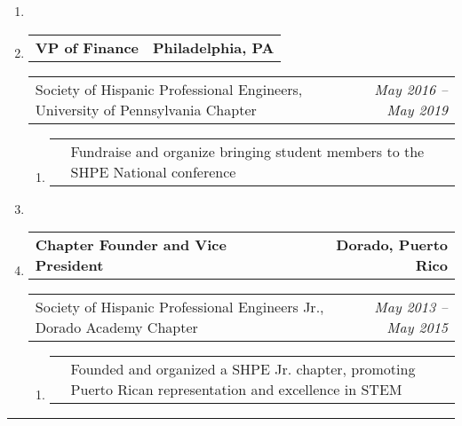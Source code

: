 \documentclass[letterpaper]{article}
\makeatletter
\newcommand*{\tabulardef}[3]{\begin{tabular}[t]{@{}lp{\dimexpr\linewidth-#1}@{}}
    #2&#3
\end{tabular}}
\newcommand{\headerrow}[2]
{\begin{tabular*}{\linewidth}{l@{\extracolsep{\fill}}r}
	#1 &
	#2 \\
\end{tabular*}}
\makeatother
\begin{document}
\begin{enumerate}[label=]
    \item

	\item
		\headerrow
			{\textbf{VP of Finance}}
			{\textbf{Philadelphia, PA}}
	\headerrow
		{Society of Hispanic Professional Engineers, University of Pennsylvania Chapter}
		{\emph{May 2016 -- May 2019}}
	\begin{enumerate}[label= *]
	\parskip=-0.1em
		\item\tabulardef{5cm}{}{Fundraise and organize bringing student members to the SHPE National conference}
	\end{enumerate}

    \item

	\item
		\headerrow
			{\textbf{Chapter Founder and Vice President}}
			{\textbf{Dorado, Puerto Rico}}
	\headerrow
		{Society of Hispanic Professional Engineers Jr., Dorado Academy Chapter}
		{\emph{May 2013 -- May 2015}}
	\begin{enumerate}[label= *]
	\parskip=-0.1em
		\item\tabulardef{5cm}{}{Founded and organized a SHPE Jr. chapter, promoting Puerto Rican representation and excellence in STEM}
	\end{enumerate}
\end{enumerate}

\hrule
\end{document}
